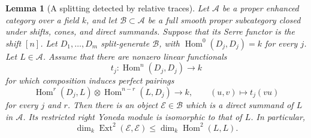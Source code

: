 \documentclass[11pt]{article}
\numberwithin{equation}{section}
\newtheorem{lemma}[theorem]{Lemma}
\theoremstyle{definition}
\theoremstyle{remark}
\begin{document}
\begin{lemma}[A splitting detected by relative traces]
\label{lem:trace-splitting}
Let $\mathcal A$ be a proper enhanced category over a field $k$, and let
$\mathcal B\subset\mathcal A$ be a full smooth proper subcategory closed
under shifts, cones, and direct summands.  Suppose that its Serre functor
is the shift $[n]$.  Let $D_1,\ldots,D_m$ split-generate $\mathcal B$,
with $\operatorname{Hom}^0(D_j,D_j)=k$ for every $j$.  Let $L\in\mathcal A$.
Assume that there are nonzero linear functionals
\[
             t_j:\operatorname{Hom}^n(D_j,D_j)\longrightarrow k
\]
for which composition induces perfect pairings
\[
 \operatorname{Hom}^r(D_j,L)\otimes\operatorname{Hom}^{n-r}(L,D_j)
      \longrightarrow k,\qquad (u,v)\longmapsto t_j(vu)
\]
for every $j$ and $r$.
Then there is an object $\mathcal E\in\mathcal B$ which is a direct
summand of $L$ in $\mathcal A$.  Its restricted right Yoneda module is
isomorphic to that of $L$.  In particular,
\[
 \dim_k\operatorname{Ext}^2(\mathcal E,\mathcal E)
          \leq \dim_k\operatorname{Hom}^2(L,L).
\]
\end{lemma}
\end{document}
